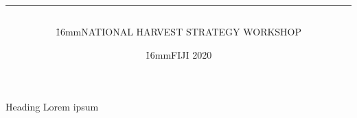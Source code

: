 \documentclass[aspectratio=169]{beamer}
\begin{document}
\begin{frame}
  \title{\centering\vspace{24mm}
    \\[-2mm]
    \blue\rule{116mm}{1.2pt}}
  \author{\vspace{-8mm}\h{16mm}\scriptsize NATIONAL HARVEST STRATEGY WORKSHOP}
  \date{\vspace{-10mm}\h{16mm}\scriptsize FIJI 2020}
  \titlepage
\end{frame}

\begin{frame}{Heading}
  Lorem ipsum
\end{frame}
\end{document}
